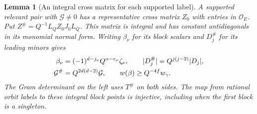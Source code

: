 \documentclass[a4paper,11pt]{article}
\newtheorem{lemma}[proposition]{Lemma}
\theoremstyle{definition}
\theoremstyle{remark}
\numberwithin{equation}{section}
\begin{document}
\begin{lemma}[An integral cross matrix for each supported label]
\label{lem:match209}
A supported relevant pair with \(\mathcal G\ne0\) has a representative
cross matrix \(Z_0\) with entries in \(\mathcal O_E\).
Put \(Z^\#=Q^{-1}L_Q Z_0 J_0 L_Q\).
This matrix is integral and has constant antidiagonals in its
monomial normal form. Writing \(\beta_\nu\) for its block scalars
and \(D_j^\#\) for its leading minors gives
\begin{align}
 \beta_\nu&=(-1)^{d-j_\nu}Q^{\alpha-e_\nu}\zeta_\nu,\qquad
 |D_j^\#|=Q^{j(j-2)}|D_j|, \label{eq:label209}\\
 \mathcal G^\#&=Q^{2d(d-2)}\mathcal G,\qquad
 w(\beta)\ge Q^{-4f} w_\gamma .                         \notag
\end{align}
The Gram determinant on the left uses \(T^\#\) on both sides.
The map from rational orbit labels to these integral block
points is injective, including when the first block is a singleton.
\end{lemma}
\end{document}
